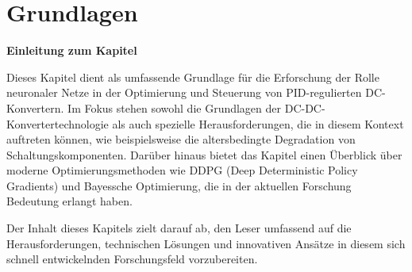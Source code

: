 \chapter{Grundlagen}




\textbf{Einleitung zum Kapitel}

Dieses Kapitel dient als umfassende Grundlage für die Erforschung der Rolle neuronaler Netze in der Optimierung und Steuerung von PID-regulierten DC-Konvertern. Im Fokus stehen sowohl die Grundlagen der DC-DC-Konvertertechnologie als auch spezielle Herausforderungen, die in diesem Kontext auftreten können, wie beispielsweise die altersbedingte Degradation von Schaltungskomponenten. Darüber hinaus bietet das Kapitel einen Überblick über moderne Optimierungsmethoden wie DDPG (Deep Deterministic Policy Gradients) und Bayessche Optimierung, die in der aktuellen Forschung Bedeutung erlangt haben.

Der Inhalt dieses Kapitels zielt darauf ab, den Leser umfassend auf die Herausforderungen, technischen Lösungen und innovativen Ansätze in diesem sich schnell entwickelnden Forschungsfeld vorzubereiten.



%



